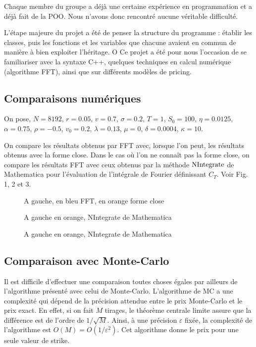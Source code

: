 \documentclass{article}
\begin{document}
Chaque membre du groupe a déjà une certaine expérience en programmation et a déjà fait de la POO. Nous n'avons donc rencontré aucune véritable difficulté.

L'étape majeure du projet a été de penser la structure du programme : établir les classes, puis les fonctions et les variables que chacune avaient en commun de manière à bien exploiter l'héritage.
O
Ce projet a été pour nous l'occasion de se familiariser avec la syntaxe C++, quelques techniques en calcul numérique (algorithme FFT), ainsi que sur différents modèles de pricing.
\subsection{Comparaisons numériques}
On pose, $N = 8192$, $r = 0.05$, $v = 0.7$, $\sigma=0.2$, $T=1$, $S_0 = 100$, $\eta = 0.0125$, $\alpha = 0.75$, $\rho = -0.5$, $v_0 = 0.2$, $\lambda = 0.13$, $\mu = 0$, $\delta = 0.0004$, $\kappa = 10$.

On compare les résultats obtenus par FFT avec, lorsque l'on peut, les résultats obtenus avec la forme close. Dans le cas où l'on ne connaît pas la forme close, on compare les résultats FFT avec ceux obtenus par la méthode $\textup{NIntegrate}$ de Mathematica pour l'évaluation de l'intégrale de Fourier définissant $C_T$. Voir Fig. 1, 2 et 3.

\begin{figure}[h]
	\centering
	\qquad
	\caption{A gauche, en bleu FFT, en orange forme close}
	\qquad
	\caption{A gauche en orange, NIntegrate de Mathematica}
	\qquad
	\caption{A gauche en orange, NIntegrate de Mathematica}
\end{figure}
\subsection{Comparaison avec Monte-Carlo}
Il est difficile d'effectuer une comparaison toutes choses égales par ailleurs de l'algorithme présenté avec celui de Monte-Carlo. L'algorithme de MC a une complexité qui dépend de la précision attendue entre le prix Monte-Carlo et le prix exact. En effet, si on fait $M$ tirages, le théorème centrale limite assure que la différence est de l'ordre de $1/\sqrt{M}$. Ainsi, à une précision $\varepsilon$ fixée, la complexité de l'algorithme est $O(M) = O(1/\varepsilon^2)$. Cet algorithme donne le prix pour une seule valeur de strike. 
\end{document}
